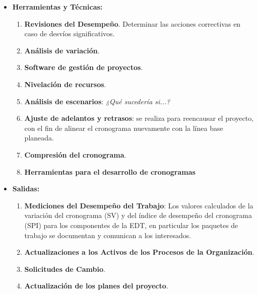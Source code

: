 \documentclass[10pt,a4paper]{article}
\begin{document}
\begin{itemize}
\begin{itemize}
\item \textbf{Herramientas y Técnicas:}
\begin{enumerate}
\item \textbf{Revisiones del Desempeño}.
\subitem Determinar las acciones correctivas en caso de desvíos significativos.
\item \textbf{Análisis de variación}.
\item \textbf{Software de gestión de proyectos}.
\item \textbf{Nivelación de recursos}.
\item \textbf{Análisis de escenarios}: \textit{¿Qué sucedería si...?}
\item \textbf{Ajuste de adelantos y retrasos}: se realiza para reencausar el proyecto, con el fin de alinear el cronograma nuevamente con la línea base
planeada.
\item \textbf{Compresión del cronograma}.
\item \textbf{Herramientas para el desarrollo de cronogramas}
\end{enumerate}

\item \textbf{Salidas:}
\begin{enumerate}
\item \textbf{Mediciones del Desempeño del Trabajo}: Los valores calculados de la variación del cronograma (SV) y del índice de desempeño del cronograma (SPI) para los componentes de la EDT, en particular los paquetes de trabajo se documentan y comunican a los interesados.
\item \textbf{Actualizaciones a los Activos de los Procesos de la Organización}.
\item \textbf{Solicitudes de Cambio}.
\item \textbf{Actualización de los planes del proyecto}.
\end{enumerate}
\end{itemize}
\end{itemize}
\end{document}
